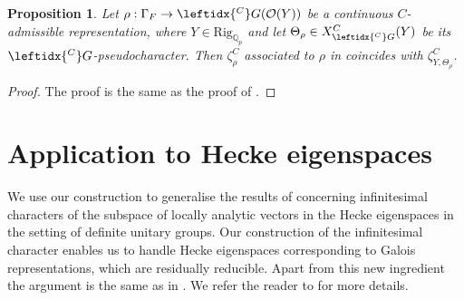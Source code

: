 \documentclass{amsart}
\newtheorem{prop}{Proposition}[section]
\theoremstyle{definition}
\theoremstyle{remark}
\newcommand{\Qp}{\mathbb {Q}_p}
\newcommand{\OO}{\mathcal O}
\newcommand{\CG}{\leftidx{^C}G{}}
\newcommand{\Rig}{\mathrm{Rig}}
\begin{document}
\begin{prop}\label{compatibility_C}
Let $\rho: \Gamma_F \rightarrow \CG(\OO(Y))$ 
be a continuous $C$-admissible representation, where $Y\in \Rig_{\Qp}$ and let $\Theta_{\rho} \in X^{C}_{\CG}(Y)$ be  its $\CG$-pseudocharacter. Then $\zeta^C_{\rho}$ associated to $\rho$ in \cite{DPS} coincides with $\zeta^C_{Y, \Theta_{\rho}}$.
\end{prop}
\begin{proof} The proof is the same as the proof of .
\end{proof} 

\section{Application to Hecke eigenspaces}\label{sec_Hecke}

We use our construction to generalise the results of \cite[Section 9.9]{DPS} concerning infinitesimal characters of the subspace 
of locally analytic vectors in the Hecke eigenspaces in the setting of definite unitary groups. Our construction 
of the infinitesimal character enables us to handle 
Hecke eigenspaces corresponding to Galois representations,
which are residually reducible. Apart from this new ingredient the argument is the same as in \cite{DPS}. We refer the reader to  for more details. 
\end{document}
